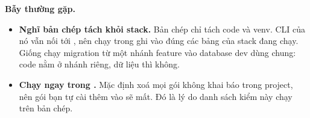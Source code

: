 \begin{luuy}
\textbf{Bẫy thường gặp.}
\begin{itemize}
  \item \textbf{Nghĩ bản chép tách khỏi stack.} Bản chép chỉ tách code và venv. CLI của nó vẫn nối tới , nên  chạy trong  ghi vào đúng các bảng của stack đang chạy. Giống chạy migration từ một nhánh feature vào database dev dùng chung: code nằm ở nhánh riêng, dữ liệu thì không.
  \item \textbf{Chạy  ngay trong .} Mặc định  xoá mọi gói không khai báo trong project, nên gói bạn tự cài thêm vào  sẽ mất. Đó là lý do danh sách kiểm này chạy trên bản chép.
\end{itemize}
\end{luuy}

